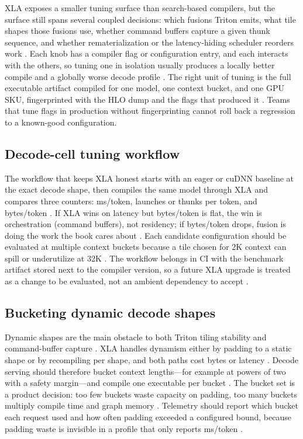 XLA exposes a smaller tuning surface than search-based compilers, but the surface still spans several coupled decisions: which fusions Triton emits, what tile shapes those fusions use, whether command buffers capture a given thunk sequence, and whether rematerialization or the latency-hiding scheduler reorders work \citep{openxla2024,patel2025llminference}. Each knob has a compiler flag or configuration entry, and each interacts with the others, so tuning one in isolation usually produces a locally better compile and a globally worse decode profile \citep{chen2020compilerbasedhardw,memoryfloor2026}. The right unit of tuning is the full executable artifact compiled for one model, one context bucket, and one GPU SKU, fingerprinted with the HLO dump and the flags that produced it \citep{yirage2026,taxbreak2026}. Teams that tune flags in production without fingerprinting cannot roll back a regression to a known-good configuration.

\subsection{Decode-cell tuning workflow}

The workflow that keeps XLA honest starts with an eager or cuDNN baseline at the exact decode shape, then compiles the same model through XLA and compares three counters: ms/token, launches or thunks per token, and bytes/token \citep{patel2025llminference,memoryfloor2026}. If XLA wins on latency but bytes/token is flat, the win is orchestration (command buffers), not residency; if bytes/token drops, fusion is doing the work the book cares about \citep{taxbreak2026,dao2022flashattention}. Each candidate configuration should be evaluated at multiple context buckets because a tile chosen for 2K context can spill or underutilize at 32K \citep{kwon2023vllm,semianalysis2024tma}. The workflow belongs in CI with the benchmark artifact stored next to the compiler version, so a future XLA upgrade is treated as a change to be evaluated, not an ambient dependency to accept \citep{chen2020compilerbasedhardw,yirage2026}.

\subsection{Bucketing dynamic decode shapes}

Dynamic shapes are the main obstacle to both Triton tiling stability and command-buffer capture \citep{openxla2024,kwon2023vllm}. XLA handles dynamism either by padding to a static shape or by recompiling per shape, and both paths cost bytes or latency \citep{openxla2024,patel2025llminference}. Decode serving should therefore bucket context lengths---for example at powers of two with a safety margin---and compile one executable per bucket \citep{taxbreak2026,memoryfloor2026}. The bucket set is a product decision: too few buckets waste capacity on padding, too many buckets multiply compile time and graph memory \citep{kwon2023vllm,chen2020compilerbasedhardw}. Telemetry should report which bucket each request used and how often padding exceeded a configured bound, because padding waste is invisible in a profile that only reports ms/token \citep{patel2025llminference,memoryfloor2026}.


